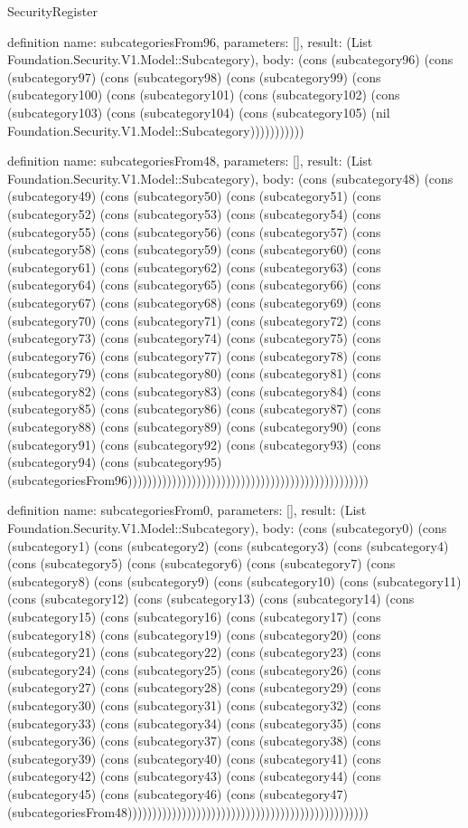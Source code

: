 \begin{lexlean}{SecurityRegister}
\begin{semanticmodule}
definition{
  name: subcategoriesFrom96,
  parameters: [],
  result: (List Foundation.Security.V1.Model::Subcategory),
  body: (cons (subcategory96) (cons (subcategory97) (cons (subcategory98) (cons (subcategory99) (cons (subcategory100) (cons (subcategory101) (cons (subcategory102) (cons (subcategory103) (cons (subcategory104) (cons (subcategory105) (nil Foundation.Security.V1.Model::Subcategory)))))))))))
}

definition{
  name: subcategoriesFrom48,
  parameters: [],
  result: (List Foundation.Security.V1.Model::Subcategory),
  body: (cons (subcategory48) (cons (subcategory49) (cons (subcategory50) (cons (subcategory51) (cons (subcategory52) (cons (subcategory53) (cons (subcategory54) (cons (subcategory55) (cons (subcategory56) (cons (subcategory57) (cons (subcategory58) (cons (subcategory59) (cons (subcategory60) (cons (subcategory61) (cons (subcategory62) (cons (subcategory63) (cons (subcategory64) (cons (subcategory65) (cons (subcategory66) (cons (subcategory67) (cons (subcategory68) (cons (subcategory69) (cons (subcategory70) (cons (subcategory71) (cons (subcategory72) (cons (subcategory73) (cons (subcategory74) (cons (subcategory75) (cons (subcategory76) (cons (subcategory77) (cons (subcategory78) (cons (subcategory79) (cons (subcategory80) (cons (subcategory81) (cons (subcategory82) (cons (subcategory83) (cons (subcategory84) (cons (subcategory85) (cons (subcategory86) (cons (subcategory87) (cons (subcategory88) (cons (subcategory89) (cons (subcategory90) (cons (subcategory91) (cons (subcategory92) (cons (subcategory93) (cons (subcategory94) (cons (subcategory95) (subcategoriesFrom96)))))))))))))))))))))))))))))))))))))))))))))))))
}

definition{
  name: subcategoriesFrom0,
  parameters: [],
  result: (List Foundation.Security.V1.Model::Subcategory),
  body: (cons (subcategory0) (cons (subcategory1) (cons (subcategory2) (cons (subcategory3) (cons (subcategory4) (cons (subcategory5) (cons (subcategory6) (cons (subcategory7) (cons (subcategory8) (cons (subcategory9) (cons (subcategory10) (cons (subcategory11) (cons (subcategory12) (cons (subcategory13) (cons (subcategory14) (cons (subcategory15) (cons (subcategory16) (cons (subcategory17) (cons (subcategory18) (cons (subcategory19) (cons (subcategory20) (cons (subcategory21) (cons (subcategory22) (cons (subcategory23) (cons (subcategory24) (cons (subcategory25) (cons (subcategory26) (cons (subcategory27) (cons (subcategory28) (cons (subcategory29) (cons (subcategory30) (cons (subcategory31) (cons (subcategory32) (cons (subcategory33) (cons (subcategory34) (cons (subcategory35) (cons (subcategory36) (cons (subcategory37) (cons (subcategory38) (cons (subcategory39) (cons (subcategory40) (cons (subcategory41) (cons (subcategory42) (cons (subcategory43) (cons (subcategory44) (cons (subcategory45) (cons (subcategory46) (cons (subcategory47) (subcategoriesFrom48)))))))))))))))))))))))))))))))))))))))))))))))))
}


\end{semanticmodule}
\end{lexlean}
